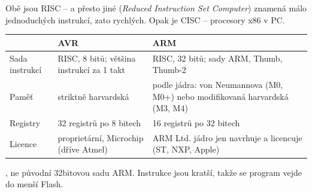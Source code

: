\documentclass[12pt,aspectratio=169]{beamer}
\begin{document}
\begin{frame}{Obě jsou RISC -- a přesto jiné}
  \small
   (\textit{Reduced Instruction Set Computer}) znamená málo
  jednoduchých instrukcí, zato rychlých. Opak je CISC -- procesory x86 v PC.
  \vspace{2mm}

  \scriptsize
  \begin{tabular}{@{}p{2.1cm}p{4.3cm}p{4.3cm}@{}}
    \toprule
     & \textbf{AVR} & \textbf{ARM} \\
    \midrule
    Sada instrukcí & RISC, 8 bitů; většina instrukcí za 1 takt
      & RISC, 32 bitů; sady ARM, Thumb, Thumb-2 \\
    \addlinespace
    Paměť & striktně harvardská
      & podle jádra: von Neumannova (M0, M0+) nebo modifikovaná harvardská (M3, M4) \\
    \addlinespace
    Registry & 32 registrů po 8 bitech & 16 registrů po 32 bitech \\
    \addlinespace
    Licence & proprietární, Microchip (dříve Atmel)
      & ARM Ltd. jádro jen navrhuje a licencuje (ST, NXP, Apple) \\
    \bottomrule
  \end{tabular}
  \vspace{2mm}

  \footnotesize
  , ne původní 32bitovou sadu ARM. Instrukce jsou
  kratší, takže se program vejde do menší Flash.
\end{frame}
\end{document}
